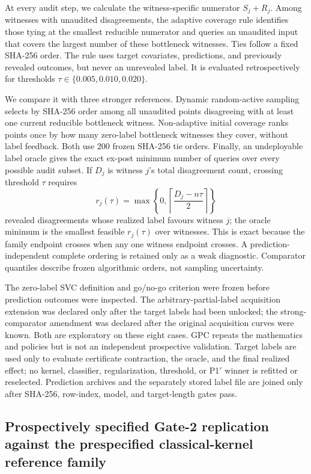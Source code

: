 \documentclass[referee,lineno,pdflatex,sn-vancouver-num]{sn-jnl}
\theoremstyle{thmstyleone}%
\theoremstyle{thmstyletwo}%
\theoremstyle{thmstylethree}%
\begin{document}
At every audit step, we calculate the witness-specific numerator $S_j+R_j$. Among witnesses with unaudited disagreements, the adaptive coverage rule identifies those tying at the smallest reducible numerator and queries an unaudited input that covers the largest number of these bottleneck witnesses. Ties follow a fixed SHA-256 order. The rule uses target covariates, predictions, and previously revealed outcomes, but never an unrevealed label. It is evaluated retrospectively for thresholds $\tau\in\{0.005,0.010,0.020\}$.

We compare it with three stronger references. Dynamic random-active sampling selects by SHA-256 order among all unaudited points disagreeing with at least one current reducible bottleneck witness. Non-adaptive initial coverage ranks points once by how many zero-label bottleneck witnesses they cover, without label feedback. Both use 200 frozen SHA-256 tie orders. Finally, an undeployable label oracle gives the exact ex-post minimum number of queries over every possible audit subset. If $D_j$ is witness $j$'s total disagreement count, crossing threshold $\tau$ requires
\[
r_j(\tau)=\max\!\left\{0,\left\lceil\frac{D_j-n\tau}{2}\right\rceil\right\}
\]
revealed disagreements whose realized label favours witness $j$; the oracle minimum is the smallest feasible $r_j(\tau)$ over witnesses. This is exact because the family endpoint crosses when any one witness endpoint crosses. A prediction-independent complete ordering is retained only as a weak diagnostic. Comparator quantiles describe frozen algorithmic orders, not sampling uncertainty.

The zero-label SVC definition and go/no-go criterion were frozen before prediction outcomes were inspected. The arbitrary-partial-label acquisition extension was declared only after the target labels had been unlocked; the strong-comparator amendment was declared after the original acquisition curves were known. Both are exploratory on these eight cases. GPC repeats the mathematics and policies but is not an independent prospective validation. Target labels are used only to evaluate certificate contraction, the oracle, and the final realized effect; no kernel, classifier, regularization, threshold, or P1$'$ winner is refitted or reselected. Prediction archives and the separately stored label file are joined only after SHA-256, row-index, model, and target-length gates pass.

\subsection{Prospectively specified Gate-2 replication against the prespecified classical-kernel reference family}
\label{sec:methods_gate2_prospective}
\end{document}
